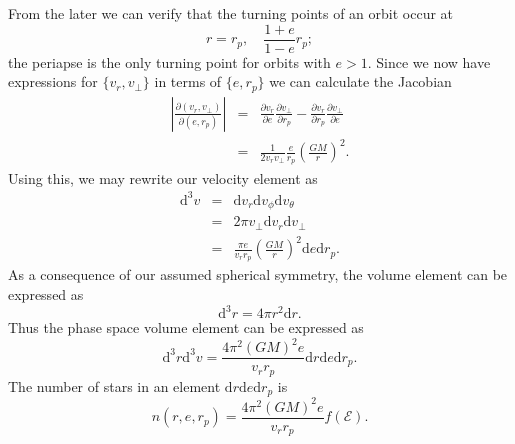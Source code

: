 \documentclass[useAMS,usenatbib]{mn2e}
\newcommand{\dd}{\ensuremath{\mathrm{d}}}
\newcommand{\partialdiff}[2]{\ensuremath{\frac{\partial {#1}}{\partial {#2}}}}
\newcommand{\recip}[1]{\ensuremath{\frac{1}{#1}}}
\begin{document}
From the later we can verify that the turning points of an orbit occur at
\begin{equation}
r = r_p,\quad \frac{1+e}{1-e}r_p;
\end{equation}
the periapse is the only turning point for orbits with $e > 1$. Since we now have expressions for $\{v_r, v_\perp\}$ in terms of $\{e, r_p\}$ we can calculate the Jacobian
\begin{eqnarray}
\left|\frac{\partial(v_r, v_\perp)}{\partial(e, r_p)}\right| & = & \partialdiff{v_r}{e}\partialdiff{v_\perp}{r_p} - \partialdiff{v_r}{r_p}\partialdiff{v_\perp}{e} \\
 & = & \recip{2v_rv_\perp}\frac{e}{r_p}\left(\frac{GM}{r}\right)^2.
\end{eqnarray}
Using this, we may rewrite our velocity element as
\begin{eqnarray}
\dd^3v & = & \dd v_r \dd v_\phi \dd v_\theta\\
 & = & 2\pi v_\perp \dd v_r \dd v_\perp\\
 & = & \frac{\pi e}{v_rr_p}\left(\frac{GM}{r}\right)^2\dd e \dd r_p.
\end{eqnarray}
As a consequence of our assumed spherical symmetry, the volume element can be expressed as
\begin{equation}
\dd^3r = 4\pi r^2 \dd r.
\end{equation}
Thus the phase space volume element can be expressed as
\begin{equation}
\dd^3r\dd^3v = \frac{4\pi^2(GM)^2e}{v_rr_p}\dd r\dd e \dd r_p.
\end{equation}
The number of stars in an element $\dd r\dd e \dd r_p$ is
\begin{equation}
n(r, e, r_p) = \frac{4\pi^2(GM)^2e}{v_rr_p}f(\mathcal{E}).
\end{equation}
\end{document}
